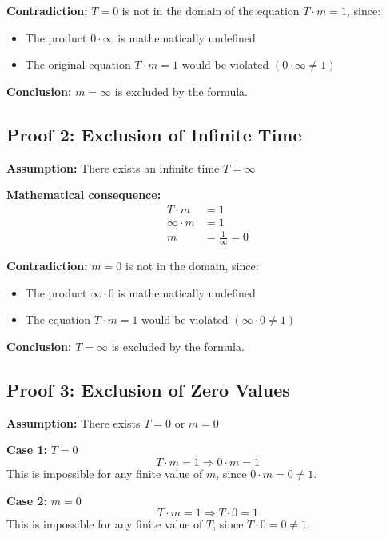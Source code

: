 	\textbf{Contradiction:} $T = 0$ is not in the domain of the equation $T \cdot m = 1$, since:
	\begin{itemize}
		\item The product $0 \cdot \infty$ is mathematically undefined
		\item The original equation $T \cdot m = 1$ would be violated $(0 \cdot \infty \neq 1)$
	\end{itemize}
	
	\textbf{Conclusion:} $m = \infty$ is excluded by the formula.
	
	\subsection{Proof 2: Exclusion of Infinite Time}
	
	\textbf{Assumption:} There exists an infinite time $T = \infty$
	
	\textbf{Mathematical consequence:}
	\begin{align}
		T \cdot m &= 1\\
		\infty \cdot m &= 1\\
		m &= \frac{1}{\infty} = 0
	\end{align}
	
	\textbf{Contradiction:} $m = 0$ is not in the domain, since:
	\begin{itemize}
		\item The product $\infty \cdot 0$ is mathematically undefined
		\item The equation $T \cdot m = 1$ would be violated $(\infty \cdot 0 \neq 1)$
	\end{itemize}
	
	\textbf{Conclusion:} $T = \infty$ is excluded by the formula.
	
	\subsection{Proof 3: Exclusion of Zero Values}
	
	\textbf{Assumption:} There exists $T = 0$ or $m = 0$
	
	\textbf{Case 1:} $T = 0$
	\begin{equation}
		T \cdot m = 1 \Rightarrow 0 \cdot m = 1
	\end{equation}
	This is impossible for any finite value of $m$, since $0 \cdot m = 0 \neq 1$.
	
	\textbf{Case 2:} $m = 0$
	\begin{equation}
		T \cdot m = 1 \Rightarrow T \cdot 0 = 1
	\end{equation}
	This is impossible for any finite value of $T$, since $T \cdot 0 = 0 \neq 1$.
	
